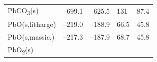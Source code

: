 \documentclass[
  9pt,
]{extbook}
\theoremstyle{definition}
\theoremstyle{definition}
\theoremstyle{definition}
\theoremstyle{remark}
\begin{document}
\begin{longtable}[]{@{}lllll@{}}
\begin{minipage}[t]{0.10\columnwidth}\raggedright
PbCO\textsubscript{3}(s)\strut
\end{minipage} & \begin{minipage}[t]{0.19\columnwidth}\raggedright
--699.1\strut
\end{minipage} & \begin{minipage}[t]{0.20\columnwidth}\raggedright
--625.5\strut
\end{minipage} & \begin{minipage}[t]{0.18\columnwidth}\raggedright
131\strut
\end{minipage} & \begin{minipage}[t]{0.18\columnwidth}\raggedright
87.4\strut
\end{minipage}\tabularnewline
\begin{minipage}[t]{0.10\columnwidth}\raggedright
PbO(s,litharge)\strut
\end{minipage} & \begin{minipage}[t]{0.19\columnwidth}\raggedright
--219.0\strut
\end{minipage} & \begin{minipage}[t]{0.20\columnwidth}\raggedright
--188.9\strut
\end{minipage} & \begin{minipage}[t]{0.18\columnwidth}\raggedright
66.5\strut
\end{minipage} & \begin{minipage}[t]{0.18\columnwidth}\raggedright
45.8\strut
\end{minipage}\tabularnewline
\begin{minipage}[t]{0.10\columnwidth}\raggedright
PbO(s,massic.)\strut
\end{minipage} & \begin{minipage}[t]{0.19\columnwidth}\raggedright
--217.3\strut
\end{minipage} & \begin{minipage}[t]{0.20\columnwidth}\raggedright
--187.9\strut
\end{minipage} & \begin{minipage}[t]{0.18\columnwidth}\raggedright
68.7\strut
\end{minipage} & \begin{minipage}[t]{0.18\columnwidth}\raggedright
45.8\strut
\end{minipage}\tabularnewline
\begin{minipage}[t]{0.10\columnwidth}\raggedright
PbO\textsubscript{2}(s)\strut
\end{minipage} & \begin{minipage}[t]{0.19\columnwidth}\raggedright

\end{minipage}
\end{longtable}
\end{document}
